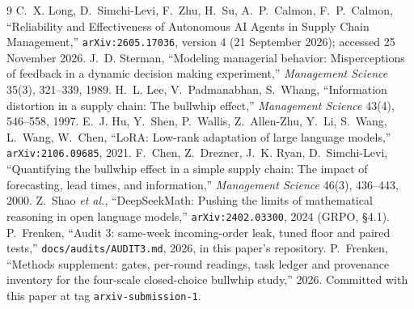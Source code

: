 \documentclass[11pt]{article}
\begin{document}
\begin{thebibliography}{9}\itemsep 0pt
 C.~X. Long, D.~Simchi-Levi, F.~Zhu, H.~Su, A.~P.~Calmon,
F.~P.~Calmon, ``Reliability and Effectiveness of Autonomous AI Agents in Supply Chain
Management,'' \texttt{arXiv:2605.17036}, version 4 (21 September 2026); accessed 25 November 2026.
 J.~D. Sterman, ``Modeling managerial behavior: Misperceptions of feedback in a
dynamic decision making experiment,'' \emph{Management Science} 35(3), 321--339, 1989.
 H.~L. Lee, V.~Padmanabhan, S.~Whang, ``Information distortion in a supply chain: The
bullwhip effect,'' \emph{Management Science} 43(4), 546--558, 1997.
 E.~J. Hu, Y.~Shen, P.~Wallis, Z.~Allen-Zhu, Y.~Li, S.~Wang, L.~Wang, W.~Chen,
``LoRA: Low-rank adaptation of large language models,'' \texttt{arXiv:2106.09685}, 2021.
 F.~Chen, Z.~Drezner, J.~K. Ryan, D.~Simchi-Levi, ``Quantifying the bullwhip effect in
a simple supply chain: The impact of forecasting, lead times, and information,''
\emph{Management Science} 46(3), 436--443, 2000.
 Z.~Shao \emph{et al.}, ``DeepSeekMath: Pushing the limits of mathematical reasoning in
open language models,'' \texttt{arXiv:2402.03300}, 2024 (GRPO, \S4.1).
 P.~Frenken, ``Audit 3: same-week incoming-order leak, tuned floor and paired tests,''
\texttt{docs/audits/AUDIT3.md}, 2026, in this paper's repository.
 P.~Frenken, ``Methods supplement: gates, per-round readings, task ledger and
provenance inventory for the four-scale closed-choice bullwhip study,'' 2026. Committed with this
paper at tag \texttt{arxiv-submission-1}.
\end{thebibliography}
\end{document}
